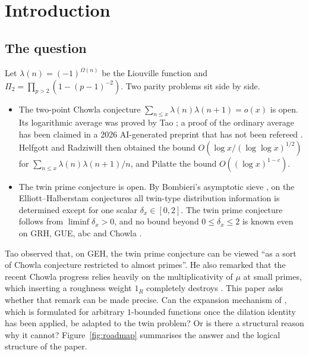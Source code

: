 \documentclass[11pt]{amsart}
\theoremstyle{definition}
\theoremstyle{remark}
\begin{document}
\maketitle
\tableofcontents

\section{Introduction}\label{sec:intro}

\subsection{The question}
Let $\lambda(n)=(-1)^{\Omega(n)}$ be the Liouville function and $\Pi_2=\prod_{p>2}(1-(p-1)^{-2})$. Two parity problems sit side by side.
\begin{itemize}
\item The two-point Chowla conjecture $\sum_{n\le x}\lambda(n)\lambda(n+1)=o(x)$ is open. Its logarithmic average was proved by Tao \cite{Tao16}; a proof of the ordinary average has been claimed in a 2026 AI-generated preprint that has not been refereed \cite{OpenAI26}. Helfgott and Radziwi\l{}\l{} \cite{HR21} then obtained the bound $O(\log x/(\log\log x)^{1/2})$ for $\sum_{n\le x}\lambda(n)\lambda(n+1)/n$, and Pilatte \cite{Pil23} the bound $O((\log x)^{1-c})$.
\item The twin prime conjecture is open. By Bombieri's asymptotic sieve \cite{Bom76,FI78}, on the Elliott--Halberstam conjectures all twin-type distribution information is determined except for one scalar $\delta_x\in[0,2]$. The twin prime conjecture follows from $\liminf\delta_x>0$, and no bound beyond $0\le\delta_x\le2$ is known even on GRH, GUE, abc and Chowla \cite{Tao16notes}.
\end{itemize}
Tao observed that, on GEH, the twin prime conjecture can be viewed ``as a sort of Chowla conjecture restricted to almost primes''. He also remarked that the recent Chowla progress relies heavily on the multiplicativity of $\mu$ at small primes, which inserting a roughness weight $1_R$ completely destroys \cite{Tao16notes}. This paper asks whether that remark can be made precise. Can the expansion mechanism of \cite{HR21,Pil23}, which is formulated for arbitrary $1$-bounded functions once the dilation identity has been applied, be adapted to the twin problem? Or is there a structural reason why it cannot? Figure~\ref{fig:roadmap} summarises the answer and the logical structure of the paper.
\end{document}
